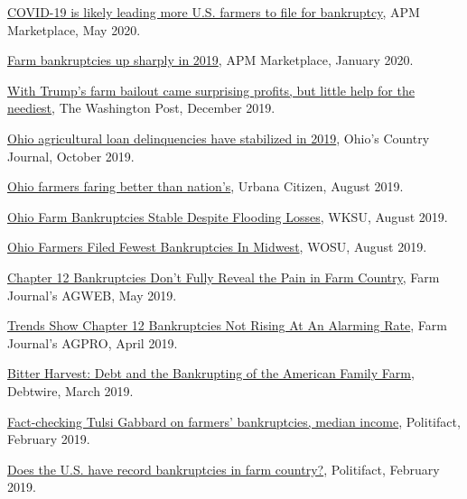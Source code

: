 \documentclass[letterpaper]{article}
\renewenvironment{itemize}{
  \begin{list}{}{
    \setlength{\leftmargin}{1.5em}
  }
}{
  \end{list}
}
\begin{document}
\begin{itemize}
\item \href{https://www.marketplace.org/2020/05/20/covid19-leading-more-farm-bankruptcies/}{COVID-19 is likely leading more U.S. farmers to file for bankruptcy}, APM Marketplace, May 2020.
\item \href{https://www.marketplace.org/2020/01/31/farm-bankruptcies-up-sharply-in-2019/}{Farm bankruptcies up sharply in 2019}, APM Marketplace, January 2020.

\item \href{https://www.washingtonpost.com/business/2019/12/21/after-miserable-farm-sector-still-came-out-ahead-thanks-government-assistance/?arc404=true}{With Trump's farm bailout came surprising profits, but little help for the neediest}, The Washington Post, December 2019.
\item \href{https://www.ocj.com/2019/10/ohio-agricultural-loan-delinquencies-have-stabilized-in-2019/}{Ohio agricultural loan delinquencies have stabilized in 2019}, Ohio's Country Journal, October 2019.
\item \href{https://www.urbanacitizen.com/news/71744/ohio-farmers-faring-better-than-nations}{Ohio farmers faring better than nation's}, Urbana Citizen, August 2019.
\item \href{https://www.wksu.org/post/ohio-farm-bankruptcies-stable-despite-flooding-losses#stream/0}{Ohio Farm Bankruptcies Stable Despite Flooding Losses}, WKSU, August 2019.
\item \href{https://radio.wosu.org/post/ohio-farmers-filed-fewest-bankruptcies-midwest#stream/0}{Ohio Farmers Filed Fewest Bankruptcies In Midwest}, WOSU, August 2019.
\item \href{https://www.agweb.com/article/chapter-12-bankruptcies-dont-fully-reveal-the-pain-in-farm-country/}{Chapter 12 Bankruptcies Don't Fully Reveal the Pain in Farm Country}, Farm Journal's AGWEB, May 2019.
\item \href{https://www.agprofessional.com/article/trends-show-chapter-12-bankruptcies-not-rising-alarming-rate}{Trends Show Chapter 12 Bankruptcies Not Rising At An Alarming Rate}, Farm Journal's AGPRO, April 2019.
\item \href{http://investigations.debtwire.com/bitter-harvest-debt-and-the-bankrupting-of-the-american-family-farm/}{Bitter Harvest: Debt and the Bankrupting of the American Family Farm}, Debtwire, March 2019.
\item \href{https://www.politifact.com/truth-o-meter/statements/2019/feb/27/tulsi-gabbard/tulsi-gabbard/}{Fact-checking Tulsi Gabbard on farmers' bankruptcies, median income}, Politifact, February 2019.
\item \href{https://www.politifact.com/punditfact/statements/2019/feb/26/heidi-heitkamp/does-us-have-record-bankruptcies-farm-country/}{Does the U.S. have record bankruptcies in farm country?}, Politifact, February 2019.


\end{itemize}
\end{document}
